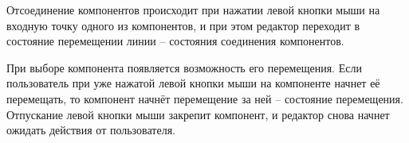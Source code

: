 Отсоединение компонентов происходит при нажатии левой кнопки
мыши на входную точку одного из компонентов, и при этом редактор
переходит в состояние перемещении линии – состояния соединения
компонентов.

При выборе компонента появляется возможность его перемещения.
Если пользователь при уже нажатой левой кнопки мыши на компоненте
начнет её перемещать, то компонент начнёт перемещение за ней – состояние
перемещения. Отпускание левой кнопки мыши закрепит компонент, и
редактор снова начнет ожидать действия от пользователя.





